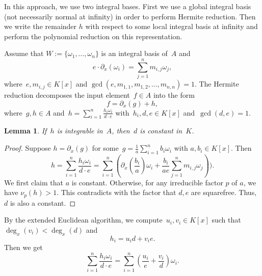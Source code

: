 \documentclass{sig-alternate}
\newtheorem{lemma}[theorem]{Lemma}
\begin{document}
In this approach, we use two integral bases. First we use a global integral basis (not
necessarily normal at infinity) in order to perform Hermite reduction. Then we write the
remainder $h$ with respect to some local integral basis at infinity and perform the
polynomial reduction on this representation.

Assume that $W := \{\omega_1, \ldots, \omega_n\}$ is an integral basis of~$A$ and
\begin{equation} \label{EQ:eM}
e \cdot  \partial_x(\omega_i) = \sum_{j=1}^n m_{i, j}\omega_j,
\end{equation}
where~$e, m_{i, j}\in K[x]$ and $\gcd(e, m_{1, 1}, m_{1, 2}, \ldots, m_{n, n})=1$.
The Hermite reduction decomposes the input element~$f\in A$ into the form
\[f = \partial_x(g) + h,\]
where~$g, h\in A$ and~$h = \sum_{i=1}^n \frac{h_i \omega_i}{d\cdot e}$ with~$h_i, d, e\in K[x]$ and~$\gcd(d, e)=1$.
\begin{lemma}\label{LEM:d}
If~$h$ is integrable in~$A$, then~$d$ is constant in~$K$.
\end{lemma}
\begin{proof}
Suppose $h = \partial_x(g)$ for some~$g = \frac{1}{a}\sum_{i=1}^n b_i \omega_i$ with $a, b_i\in K[x]$.
Then
\[ h = \sum_{i=1}^n \frac{h_i \omega_i}{d\cdot e}= \sum_{i=1}^n (\partial_x(\frac{b_i}{a}) \omega_i + \frac{b_i}{a e} \sum_{j=1}^n  m_{i, j}\omega_j)).\]
We first claim that $a$ is constant. Otherwise, for any irreducible factor $p$ of $a$, we have $\nu_p(h) > 1$. This contradicts
with the factor that $d, e$ are squarefree. Thus, $d$ is also a constant.
\end{proof}

By the extended Euclidean algorithm, we compute~$u_i, v_i\in K[x]$ such that
$\deg_x(v_i) < \deg_x(d)$ and
\[h_i = u_i d + v_i e.\]
Then we get
\[ \sum_{i=1}^n \frac{h_i\omega_i}{d \cdot e} =  \sum_{i=1}^n \left(\frac{u_i}{e} + \frac{v_i}{d}\right)\omega_i.\]
\end{document}
